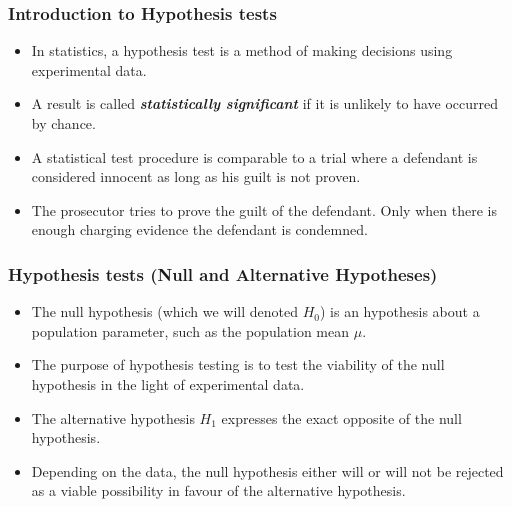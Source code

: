 
\begin{frame}
\frametitle{Introduction to Hypothesis tests}
\large
\begin{itemize} \item
In statistics, a  hypothesis test is a method of making decisions using experimental data. \item A result is called \textbf{\emph{statistically significant}} if it is unlikely to have occurred by chance. \item A statistical test procedure is comparable to a trial where a defendant is considered innocent as long as his guilt is not proven.\item  The prosecutor tries to prove the guilt of the defendant. Only when there is enough charging evidence the defendant is condemned.
\end{itemize}

\end{frame}


\begin{frame}
\frametitle{Hypothesis tests (Null and Alternative Hypotheses) }
\large
\begin{itemize}
\item The null hypothesis (which we will denoted $H_0$) is an hypothesis about a population parameter, such as the population mean $\mu$. \item The purpose of hypothesis testing is to test the viability of the null hypothesis in the light of experimental data. \item The alternative hypothesis $H_1$ expresses the exact opposite of the null hypothesis. \item Depending on the data, the null hypothesis either will or will not be rejected as a viable possibility in favour of the alternative hypothesis.
\end{itemize}

\end{frame}



